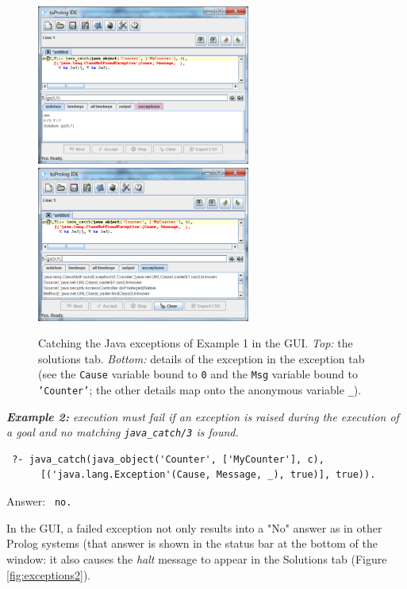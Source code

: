 \begin{figure}
  \centering
  \includegraphics[width=7cm]{images/exceptions1a}
  \includegraphics[width=7cm]{images/exceptions1b}
  \caption{Catching the Java exceptions of Example 1 in the \tuprolog{} GUI.
  \textit{Top:} the solutions tab.
  \textit{Bottom:} details of the exception in the exception tab (see the \texttt{Cause} variable bound to \texttt{0} and the \texttt{Msg} variable bound to \texttt{'Counter'}; the other details map onto the anonymous variable \texttt{\_}). }\label{fig:exceptions1}
\end{figure}


\medskip\noindent
\textit{\textbf{Example 2:} execution must fail if an exception is raised during the execution of a goal and no matching \texttt{java\_catch/3} is found.}
\begin{verbatim}
 ?- java_catch(java_object('Counter', ['MyCounter'], c),
      [('java.lang.Exception'(Cause, Message, _), true)], true)).
\end{verbatim}

Answer: \texttt{ no.}

\noindent In the \tuprolog{} GUI, a failed exception not only results into a "No" answer as in other Prolog systems (that answer is shown in the status bar at the bottom of the window: it also causes the \textit{halt} message to appear in the Solutions tab (Figure \ref{fig:exceptions2}).

